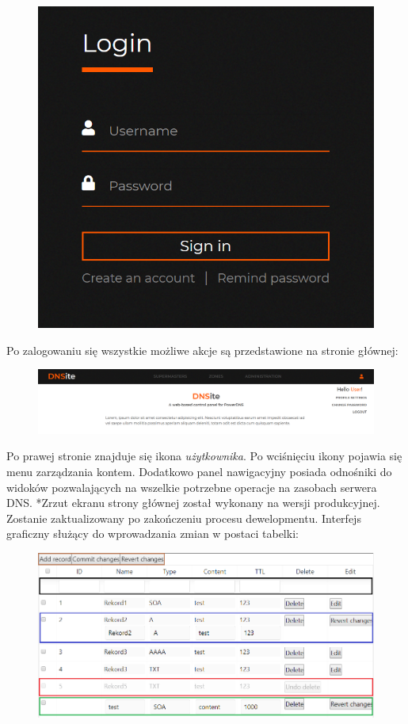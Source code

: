 \documentclass[12pt] {article}
\begin{document}
\begin{figure}[H]
\centering
\includegraphics[scale=0.4]{res/Login_1}
\end{figure}
Po zalogowaniu się wszystkie możliwe akcje są przedstawione na stronie głównej:
\begin{figure}[H]
\centering
\includegraphics[width=\textwidth]{res/Glowna_strona}
\end{figure}
Po prawej stronie znajduje się ikona \textit{użytkownika}. Po wciśnięciu ikony pojawia się menu zarządzania kontem. Dodatkowo panel nawigacyjny posiada odnośniki do widoków pozwalających na wszelkie potrzebne operacje na zasobach serwera DNS.\newline
*Zrzut ekranu strony głównej został wykonany na wersji produkcyjnej. Zostanie zaktualizowany po zakończeniu procesu dewelopmentu. \newpage
Interfejs graficzny służący do wprowadzania zmian w postaci tabelki:
\begin{figure}[H]
\centering
\includegraphics[width=\textwidth]{res/Tabelka}
\end{figure}
\end{document}
